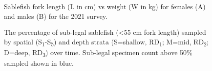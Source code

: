\documentclass[12pt]{article}\usepackage[]{graphicx}\usepackage[]{color}
\begin{document}
\begin{figure}[htb]

{\centering {} 

}

\caption{Sablefish fork length (L in cm) vs weight (W in kg) for females (A) and males (B) for the 2021 survey.}\label{fig:figure14}
\end{figure}

\begin{figure}[htb]

{\centering {} 

}

\caption{The percentage of sub-legal sablefish (\textless55 cm fork length) sampled by spatial (S\textsubscript{1}-S\textsubscript{5}) and depth strata (S=shallow, RD\textsubscript{1}; M=mid, RD\textsubscript{2}; D=deep, RD\textsubscript{3}) over time. Sub-legal specimen count above 50\% sampled shown in blue.}\label{fig:figure15}
\end{figure}
\clearpage
\end{document}

